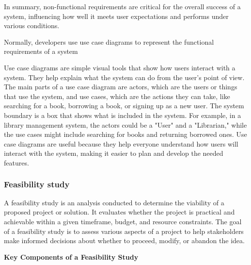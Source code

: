 \documentclass[a4paper]{article}
\begin{document}
In summary, non-functional requirements are critical for the overall success of a system, influencing how well it meets user expectations 
and performs under various conditions.

Normally, developers use use case diagrams to represent the functional requirements of a system

Use case diagrams are simple visual tools that show how users interact with a system. They help explain what the system can do from the user's point of view. The main parts 
of a use case diagram are actors, which are the users or things that use the system, and use cases, which are the actions they can
take, like searching for a book, borrowing a book, or signing up as a new user. The system boundary is a box that shows what is included in the system. For example, in a library management system, the actors could be a "User" and a "Librarian," while the use cases might include searching for books and returning borrowed ones. Use case diagrams are useful because they help everyone understand how users will interact with the system, making it easier to plan and develop the needed features.



\subsubsection{Feasibility study}



A feasibility study is an analysis conducted to determine the viability of a proposed project or solution. It evaluates whether 
the project is practical and achievable within a given timeframe, budget, and resource constraints. The goal of a feasibility study is to
assess various aspects of a project to help stakeholders make informed decisions about whether to proceed, modify, or abandon the idea.

\textbf{Key Components of a Feasibility Study}
\end{document}
